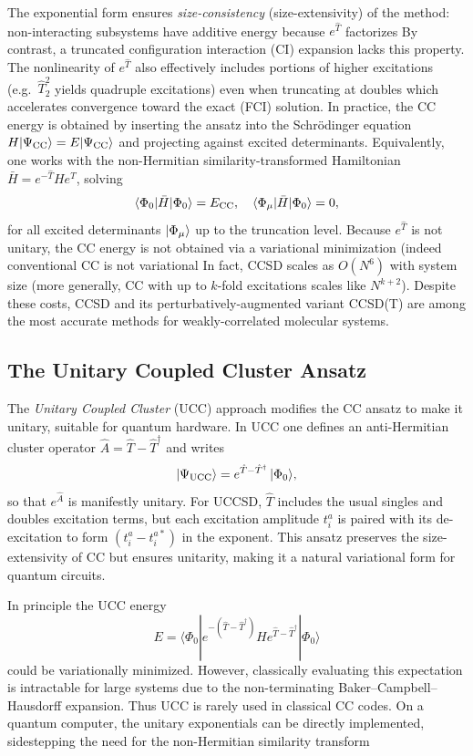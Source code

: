 \documentclass[twocolumn,superscriptaddress,unsortedaddress,nofootinbib,amsmath,amssymb,
aps,floatfix]{revtex4-2}
\begin{document}
The exponential form ensures \emph{size-consistency}
(size-extensivity) of the method: non-interacting subsystems have
additive energy because $e^{\hat T}$ factorizes By contrast, a
truncated configuration interaction (CI) expansion lacks this
property.  The nonlinearity of $e^{\hat T}$ also effectively includes
portions of higher excitations (e.g.\ $\hat T_2^2$ yields quadruple
excitations) even when truncating at doubles
which accelerates convergence toward the exact (FCI) solution.  In
practice, the CC energy is obtained by inserting the ansatz into the
Schrödinger equation $H|\Psi_{\rm CC}\rangle = E|\Psi_{\rm CC}\rangle$
and projecting against excited determinants.  Equivalently, one works
with the non-Hermitian similarity-transformed Hamiltonian $\bar H=e^{-\hat T}He^{\hat T}$, solving
\[
\langle\Phi_0|\bar H|\Phi_0\rangle = E_{\rm CC},\quad 
\langle\Phi_{\mu}|\bar H|\Phi_0\rangle = 0,
\]
for all excited determinants $\ket{\Phi_\mu}$ up to the truncation
level.  Because $e^{\hat T}$ is not unitary, the CC energy is not
obtained via a variational minimization (indeed conventional CC is not
variational In fact, CCSD scales as $O(N^6)$ with system size (more
generally, CC with up to $k$-fold excitations scales like $N^{k+2}$).
Despite these costs, CCSD and its perturbatively-augmented variant
CCSD(T) are among the most accurate methods for weakly-correlated
molecular systems.

\subsection{The Unitary Coupled Cluster Ansatz}
The \emph{Unitary Coupled Cluster} (UCC) approach modifies the CC ansatz to make it unitary, suitable for quantum hardware.  In UCC one defines an anti-Hermitian cluster operator $\hat A = \hat T - \hat T^\dagger$ and writes 
\begin{equation}
|\Psi_{\rm UCC}\rangle = e^{\hat T - \hat T^\dagger}\,|\Phi_0\rangle,
\end{equation}
so that $e^{\hat A}$ is manifestly unitary.  For UCCSD, $\hat T$ includes the usual singles and doubles excitation terms, but each excitation amplitude $t_i^a$ is paired with its de-excitation to form $(t_i^a - t_i^{a*})$ in the exponent. 
This ansatz preserves the size-extensivity of CC but ensures unitarity, making it a natural variational form for quantum circuits.

In principle the UCC energy
\[
E=\langle\Phi_0|e^{-(\hat T-\hat
  T^\dagger)} H e^{\hat T-\hat T^\dagger}|\Phi_0\rangle
\]
could be
variationally minimized.  However, classically evaluating this
expectation is intractable for large systems due to the
non-terminating Baker–Campbell–Hausdorff expansion.  Thus UCC is
rarely used in classical CC codes.  On a quantum computer, the unitary
exponentials can be directly implemented, sidestepping the need for
the non-Hermitian similarity transform
\end{document}
